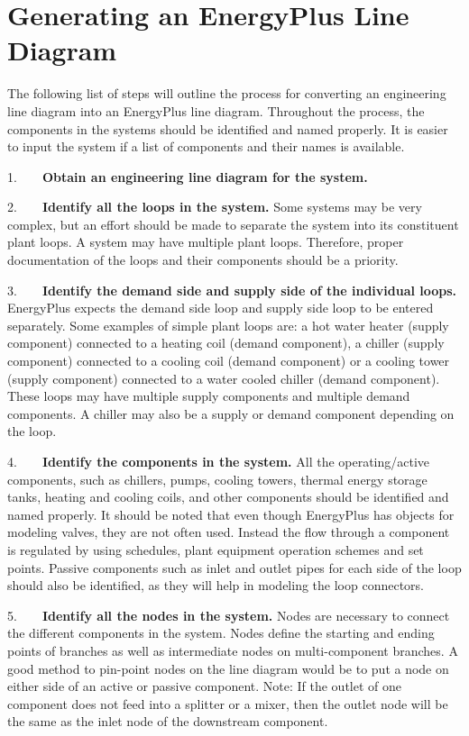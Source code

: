 \chapter{Generating an EnergyPlus Line Diagram}\label{generating-an-energyplus-line-diagram}

The following list of steps will outline the process for converting an engineering line diagram into an EnergyPlus line diagram. Throughout the process, the components in the systems should be identified and named properly. It is easier to input the system if a list of components and their names is available.

1.~~~~\textbf{Obtain an engineering line diagram for the system.}

2.~~~~\textbf{Identify all the loops in the system.} Some systems may be very complex, but an effort should be made to separate the system into its constituent plant loops. A system may have multiple plant loops. Therefore, proper documentation of the loops and their components should be a priority.

3.~~~~\textbf{Identify the demand side and supply side of the individual loops.} EnergyPlus expects the demand side loop and supply side loop to be entered separately. Some examples of simple plant loops are: a hot water heater (supply component) connected to a heating coil (demand component), a chiller (supply component) connected to a cooling coil (demand component) or a cooling tower (supply component) connected to a water cooled chiller (demand component). These loops may have multiple supply components and multiple demand components. A chiller may also be a supply or demand component depending on the loop.

4.~~~~\textbf{Identify the components in the system.} All the operating/active components, such as chillers, pumps, cooling towers, thermal energy storage tanks, heating and cooling coils, and other components should be identified and named properly. It should be noted that even though EnergyPlus has objects for modeling valves, they are not often used. Instead the flow through a component is regulated by using schedules, plant equipment operation schemes and set points. Passive components such as inlet and outlet pipes for each side of the loop should also be identified, as they will help in modeling the loop connectors.

5.~~~~\textbf{Identify all the nodes in the system.} Nodes are necessary to connect the different components in the system. Nodes define the starting and ending points of branches as well as intermediate nodes on multi-component branches. A good method to pin-point nodes on the line diagram would be to put a node on either side of an active or passive component. Note: If the outlet of one component does not feed into a splitter or a mixer, then the outlet node will be the same as the inlet node of the downstream component.

